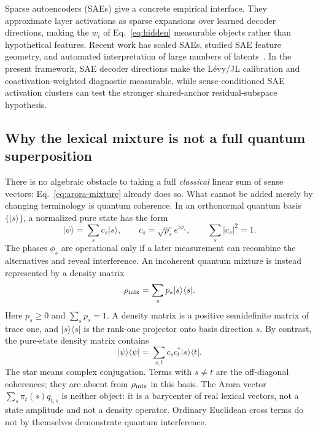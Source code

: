\documentclass[
  aps,
  reprint,
  superscriptaddress,
  floatfix,
  nofootinbib,
  longbibliography
]{revtex4-2}
\begin{document}
Sparse autoencoders (SAEs) give a concrete empirical interface. They
approximate layer activations as sparse expansions over learned decoder
directions, making the $w_i$ of Eq.~\eqref{eq:hidden} measurable
objects rather than hypothetical features. Recent work has scaled SAEs,
studied SAE feature geometry, and automated interpretation of large
numbers of latents~\cite{gao2025scaling,li2025geometry,paulo2025automatically,shu2025survey}. In the
present framework, SAE decoder directions make the L\'evy/JL calibration and
coactivation-weighted diagnostic measurable, while sense-conditioned SAE
activation clusters can test the stronger shared-anchor residual-subspace hypothesis.

\subsection{Why the lexical mixture is not a full quantum superposition}

There is no algebraic obstacle to taking a full \emph{classical} linear sum of
sense vectors: Eq.~\eqref{eq:arora-mixture} already does so.  What cannot be
added merely by changing terminology is quantum coherence.  In an orthonormal
quantum basis $\{\lvert s\rangle\}$, a normalized pure state has the form
%
\begin{equation}
\label{eq:quantum-coherent-state}
\lvert\psi\rangle=\sum_s c_s\lvert s\rangle,
\qquad c_s=\sqrt{p_s}e^{i\phi_s},
\qquad \sum_s|c_s|^2=1 .
\end{equation}
%
The phases $\phi_s$ are operational only if a later measurement can recombine
the alternatives and reveal interference.  An incoherent quantum mixture is
instead represented by a density matrix
%
\begin{equation}
\label{eq:quantum-mixture}
\rho_{\rm mix}=\sum_s p_s\lvert s\rangle\langle s\rvert .
\end{equation}
%
Here $p_s\geq0$ and $\sum_s p_s=1$.  A density matrix is a positive
semidefinite matrix of trace one, and
$\lvert s\rangle\langle s\rvert$ is the rank-one projector onto basis
direction $s$.  By contrast, the pure-state density matrix contains
%
\begin{equation}
\label{eq:pure-density-coherences}
\lvert\psi\rangle\langle\psi\rvert
=\sum_{s,t}c_sc_t^*\lvert s\rangle\langle t\rvert .
\end{equation}
%
The star means complex conjugation.  Terms with $s\ne t$ are the off-diagonal
coherences; they are absent from $\rho_{\rm mix}$ in this basis.
The Arora vector $\sum_s\pi_t(s)q_{t,s}$ is neither object: it is a barycenter
of real lexical vectors, not a state amplitude and not a density operator.
Ordinary Euclidean cross terms do not by themselves demonstrate quantum
interference.
\end{document}
